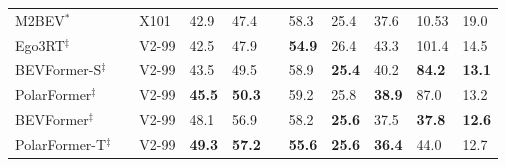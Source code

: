 \documentclass[letterpaper]{article} \usepackage{aaai23}  \usepackage{times}  \usepackage{helvet}  \usepackage{courier}  \usepackage[hyphens]{url}  \usepackage{graphicx} \urlstyle{rm} \def\UrlFont{\rm}  \usepackage{natbib}  \usepackage{caption} \frenchspacing  \setlength{\pdfpagewidth}{8.5in} \setlength{\pdfpageheight}{11in} \usepackage{algorithm}
\begin{document}
\begin{table*}[!t]
\begin{tabular}{lC{0.0cm}C{1cm}C{1.2cm}C{0.5cm}C{0.15cm}C{0.75cm}C{0.75cm}C{0.75cm}C{0.75cm}C{0.75cm}}
    M2BEV$^{*}$~\cite{xie2022m} & & X101 &  42.9 & 47.4 & & 58.3 & 25.4 & 37.6 & 10.53 & 19.0 \\
    Ego3RT$^{\ddag}$~\cite{lu2022ego3rt} & &V2-99 &  42.5 & 47.9 & & \textbf{54.9} & 26.4 & 43.3 & 101.4 & 14.5 \\ 
    BEVFormer-S$^{\ddag}$ & & V2-99 & 43.5  & 49.5 & & 58.9 & \textbf{25.4} & 40.2 & \textbf{84.2} & \textbf{13.1}\\
    PolarFormer$^{\ddag}$ & & V2-99& \textbf{45.5}  & \textbf{50.3} & & 59.2 & 25.8 & \textbf{38.9} & 87.0 & 13.2 \\

    \cmidrule(lr){1-11}
    BEVFormer$^{\ddag}$~\cite{li2022bevformer} & & V2-99 & 48.1   & 56.9 & & 58.2 & \textbf{25.6} & 37.5 & \textbf{37.8} & \textbf{12.6}  \\
    
    PolarFormer-T$^{\ddag}$ & & V2-99 & \textbf{49.3} & \textbf{57.2} & &  \textbf{55.6} & \textbf{25.6} & \textbf{36.4} & 44.0 & 12.7  \\
    \hline
    
    \hline
    \end{tabular}
  \label{tab:nus-det-val}
\end{table*}
\end{document}
